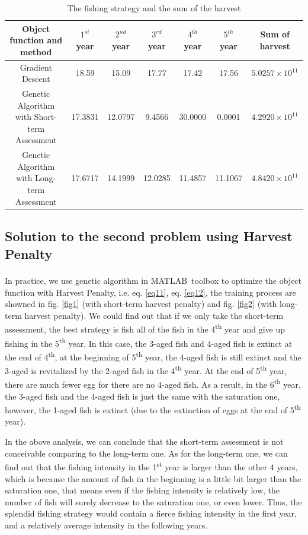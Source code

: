 \documentclass{IEEEtran}
\begin{document}
\begin{table}
    \normalsize
    \caption{The fishing strategy and the sum of the harvest}
    \label{tab1}
    \begin{tabular}{ccccccc}\toprule
        Object function and method & $1^{st}$ year & $2^{nd}$ year & $3^{rd}$ year & $4^{th}$ year & $5^{th}$ year & Sum of harvest \\ 
        \midrule
        Gradient Descent & 18.59 & 15.09 & 17.77 & 17.42 & 17.56 & $5.0257\times10^{11}$\\
        Genetic Algorithm with Short-term Assessment & 17.3831 & 12.0797 & 9.4566 & 30.0000 & 0.0001 & $4.2920\times10^{11}$\\ 
        Genetic Algorithm with Long-term Assessment & 17.6717 & 14.1999 & 12.0285 & 11.4857 & 11.1067 & $4.8420\times10^{11}$\\
        \bottomrule
    \end{tabular} 
\end{table}

\subsection{Solution to the second problem using Harvest Penalty}

In practice, we use genetic algorithm in MATLAB\textsuperscript\textregistered \ toolbox\textsuperscript{\cite{MATLABOptimizationToolbox}} to optimize the object function with Harvest Penalty, i.e. eq. \ref{eq11}, eq. \ref{eq12}, the training process are showned in fig. \ref{fig1} (with short-term harvest penalty) and fig. \ref{fig2} (with long-term harvest penalty). We could find out that if we only take the short-term assessment, the best strategy is fish all of the fish in the 4\textsuperscript{th} year and give up fishing in the 5\textsuperscript{th} year. In this case, the 3-aged fish and 4-aged fish is extinct at the end of 4\textsuperscript{th}, at the beginning of 5\textsuperscript{th} year, the 4-aged fish is still extinct and the 3-aged is revitalized by the 2-aged fish in the 4\textsuperscript{th} year. At the end of 5\textsuperscript{th} year, there are much fewer egg for there are no 4-aged fish. As a result, in the 6\textsuperscript{th} year, the 3-aged fish and the 4-aged fish is just the same with the saturation one, however, the 1-aged fish is extinct (due to the extinction of eggs at the end of 5\textsuperscript{th} year). 

In the above analysis, we can conclude that the short-term assessment is not conceivable comparing to the long-term one. As for the long-term one, we can find out that the fishing intensity in the 1\textsuperscript{st} year is larger than the other 4 years, which is because the amount of fish in the beginning is a little bit larger than the saturation one, that means even if the fishing intensity is relatively low, the number of fish will surely decrease to the saturation one, or even lower. Thus, the splendid fishing strategy would contain a fierce fishing intensity in the first year, and a relatively average intensity in the following years. 
\end{document}
